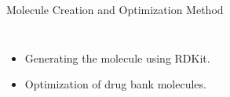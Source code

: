 \documentclass{beamer}
\begin{document}
\begin{frame}{Molecule Creation and Optimization Method}
    \begin{columns}
            \begin{itemize}
            \item Generating the molecule using RDKit.
            \item Optimization of drug bank molecules.
      \end{itemize}
    \end{columns}
\end{frame}
\end{document}
